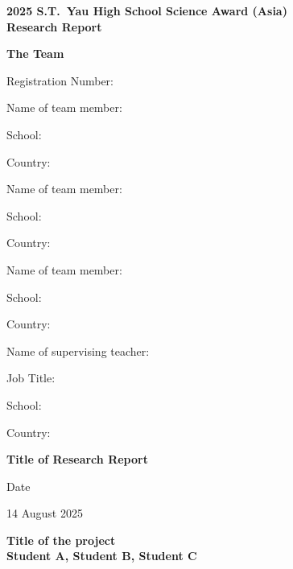 \documentclass[12pt,a4paper]{article}
\begin{document}
\pagestyle{fancy}
\fancyhf{}
\renewcommand{\headrulewidth}{0pt}

\begin{center}
  
  {\bfseries 2025 S.T.~Yau High School Science Award (Asia)}\\
  \vspace{1em}
  {\bfseries Research Report}\\[1.2ex]
\end{center}

\vspace{2em}

{\large\bfseries The Team}\par\medskip
Registration Number:

\bigskip
Name of team member:

School:

Country:

\bigskip\vspace{2em}
Name of team member:

School:

Country:

\bigskip\vspace{2em}
Name of team member:

School:

Country:

\bigskip\vspace{4em}
Name of supervising teacher:

Job Title:

School:

Country:

\bigskip\vspace{2em}
{\large\bfseries Title of Research Report}\par\medskip



\vspace{4em}
Date

14 August 2025

\newpage

\setcounter{page}{1}
\begin{center}
    \textbf{Title of the project}\\
    \vspace{0.5cm}
    \textbf{Student A, Student B, Student C}
\end{center}

\newpage
\end{document}
